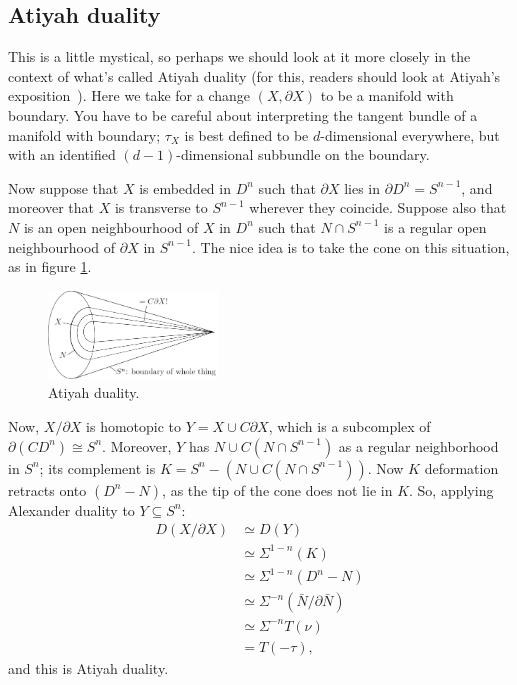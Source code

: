 \documentclass{article}
\newcommand{\Suspend}{\Sigma}
\theoremstyle{definition}
\begin{document}
\subsection*{Atiyah duality}
This is a little mystical, so perhaps we should look at it more closely in the context of what's called Atiyah duality (for this, readers should look at Atiyah's exposition~\cite{Atiyah}).  Here we take for a change $(X, \partial X)$ to be a manifold with boundary.  You have to be careful about interpreting the tangent bundle of a manifold with boundary; $\tau_X$ is best defined to be $d$-dimensional everywhere, but with an identified $(d-1)$-dimensional subbundle on the boundary.  %

Now suppose that $X$ is embedded in $D^n$ such that $\partial X$ lies in $\partial D^n=S^{n-1}$, and moreover that $X$ is transverse to $S^{n-1}$ wherever they coincide. Suppose also that $N$ is an open neighbourhood of $X$ in $D^n$ such that $N\cap S^{n-1}$ is a regular open neighbourhood of $\partial X$ in $S^{n-1}$.
The nice idea is to take the cone on this situation, as in figure \ref{AtiyahDuality}.
\begin{figure}[ht!]
\centering\includegraphics[width=0.4\textwidth]{figures/figure29.pdf}
\caption{\small Atiyah duality.}\label{AtiyahDuality}
\end{figure}

Now, $X / \partial X$ is homotopic to  $Y = X \cup C \partial X$, which is a subcomplex of $\partial(CD^n)\cong S^n$.  Moreover, $Y$ has $N \cup C(N \cap S^{n-1})$ as a regular neighborhood in $S^n$; its complement is $K=S^n - (N \cup C(N \cap S^{n-1}))$.  Now $K$ deformation retracts onto $(D^n-N)$, as the tip of the cone does not lie in $K$. So, applying Alexander duality to $Y\subseteq S^n$:
\begin{align*}
D(X / \partial X) & \simeq D(Y) \\
& \simeq \Suspend^{1-n}(K) \\
& \simeq \Suspend^{1-n}(D^n - N) \\
& \simeq \Suspend^{-n}(\bar N / \partial \bar N) \\
& \simeq \Suspend^{-n} T (\nu)\\
& = T(-\tau),
\end{align*}
and this is Atiyah duality.
\end{document}
